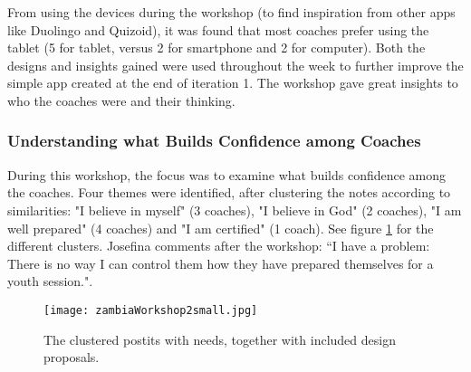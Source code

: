     From using the devices during the workshop (to find inspiration from other apps like Duolingo and Quizoid), it was found that most coaches prefer using the tablet (5 for tablet, versus 2 for smartphone and 2 for computer). Both the designs and insights gained were used throughout the week to further improve the simple app created at the end of iteration 1. The workshop gave great insights to who the coaches were and their thinking.

    \subsubsection{Understanding what Builds Confidence among Coaches}

    During this workshop, the focus was to examine what builds confidence among the coaches. Four themes were identified, after clustering the notes according to similarities: "I believe in myself" (3 coaches), "I believe in God" (2 coaches), "I am well prepared" (4 coaches) and "I am certified" (1 coach). See figure \ref{fig:zambiaWorkshop2} for the different clusters. Josefina comments after the workshop: “I have a problem: There is no way I can control them how they have prepared themselves for a youth session.".

    \begin{figure}[h]
        \centering
        \texttt{[image: zambiaWorkshop2small.jpg]}
        \caption{The clustered postits with needs, together with included design proposals.}
        \label{fig:zambiaWorkshop2}
    \end{figure}
